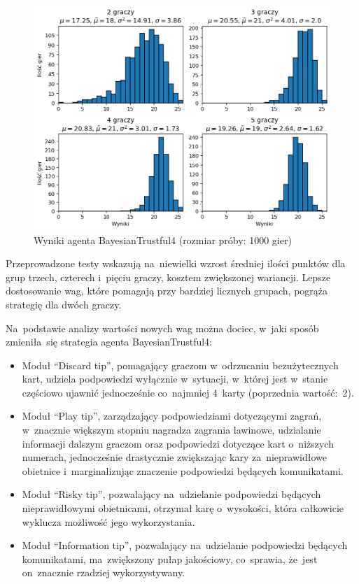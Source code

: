 \documentclass[declaration,shortabstract,inz]{iithesis}
\begin{document}
\begin{figure}[H]
	\centering
	\captionsetup{format=hang}
	\includegraphics[width=\textwidth,height=\textheight,keepaspectratio]{BayesianTrustful4.png}
	\caption[Caption]{Wyniki agenta BayesianTrustful4 (rozmiar próby: 1000 gier)}
	\label{fig:BayesianTrustful4}
\end{figure}

Przeprowadzone testy wskazują na~niewielki wzrost średniej ilości punktów dla grup trzech, czterech i~pięciu graczy, kosztem zwiększonej wariancji. Lepsze dostosowanie wag, które pomagają przy bardziej licznych grupach, pogrąża strategię dla dwóch graczy.

Na~podstawie analizy wartości nowych wag można dociec, w~jaki sposób zmieniła~się strategia agenta BayesianTrustful4:

\begin{itemize}
	\item Moduł ``Discard tip'', pomagający graczom w~odrzucaniu bezużytecznych kart, udziela podpowiedzi wyłącznie w~sytuacji, w~której jest w~stanie częściowo ujawnić jednocześnie co~najmniej 4~karty (poprzednia wartość:~2).
	\item Moduł ``Play tip'', zarządzający podpowiedziami dotyczącymi zagrań, w~znacznie większym stopniu nagradza zagrania lawinowe, udzialanie informacji dalszym graczom oraz podpowiedzi dotyczące kart o~niższych numerach, jednocześnie drastycznie zwiększając kary za~nieprawidłowe obietnice i~marginalizując znaczenie podpowiedzi będących komunikatami.
	\item Moduł ``Risky tip'', pozwalający na~udzielanie podpowiedzi będących nieprawidłowymi obietnicami, otrzymał karę o~wysokości, która całkowicie wyklucza możliwość jego wykorzystania.
	\item Moduł ``Information tip'', pozwalający na~udzielanie podpowiedzi będących komunikatami, ma~zwiększony pułap jakościowy, co~sprawia, że~jest on~znacznie rzadziej wykorzystywany.
\end{itemize}
\end{document}
